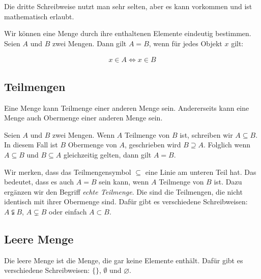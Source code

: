 \documentclass[12pt,a4paper,oneside]{article}
\newcommand{\emptyline}{\hspace*{\fill}}
\begin{document}
            Die dritte Schreibweise nutzt man sehr selten, aber es kann vorkommen und ist mathematisch erlaubt.

            \emptyline

            Wir können eine Menge durch ihre enthaltenen Elemente eindeutig bestimmen.
            Seien $A$ und $B$ zwei Mengen.
            Dann gilt $A = B$, wenn für jedes Objekt $x$ gilt:

            \vspace{-1em}
            \begin{align*}
                x \in A \Longleftrightarrow x \in B
            \end{align*}

        \subsection{Teilmengen}

            Eine Menge kann Teilmenge einer anderen Menge sein.
            Andererseits kann eine Menge auch Obermenge einer anderen Menge sein.

            \emptyline

            Seien $A$ und $B$ zwei Mengen.
            Wenn $A$ Teilmenge von $B$ ist, schreiben wir $A \subseteq B$.
            In diesem Fall ist $B$ Obermenge von $A$, geschrieben wird $B \supseteq A$.
            Folglich wenn $A \subseteq B$ und $B \subseteq A$ gleichzeitig gelten, dann gilt $A = B$.

            \emptyline

            Wir merken, dass das Teilmengensymbol $\subseteq$ eine Linie am unteren Teil hat.
            Das bedeutet, dass es auch $A = B$ sein kann, wenn $A$ Teilmenge von $B$ ist.
            Dazu ergänzen wir den Begriff \textit{echte Teilmenge}.
            Die sind die Teilmengen, die nicht identisch mit ihrer Obermenge sind.
            Dafür gibt es verschiedene Schreibweisen: $A \subsetneqq B$, $A \subsetneq B$ oder einfach $A \subset B$.

        \subsection{Leere Menge}

            Die leere Menge ist die Menge, die gar keine Elemente enthält.
            Dafür gibt es verschiedene Schreibweisen: $\{\}$, $\emptyset$ und $\varnothing$.

            \emptyline
\end{document}
